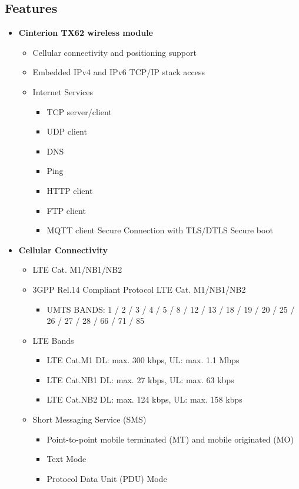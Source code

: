 	\subsection{Features} \cite{ArduinoPortenta:2024}
	\begin{itemize}[leftmargin=*]
		\item \textbf{Cinterion TX62 wireless module}
		\begin{itemize}[leftmargin=*]
			\item Cellular connectivity and positioning support
			\item Embedded IPv4 and IPv6 TCP/IP stack access
			\item Internet Services
			\begin{itemize}[label=--]
				\item TCP server/client
				\item UDP client
				\item DNS
				\item Ping
				\item HTTP client
				\item FTP client
				\item MQTT client Secure Connection with TLS/DTLS Secure boot
			\end{itemize}
		\end{itemize}
		
		\item \textbf{Cellular Connectivity}
		\begin{itemize}[leftmargin=*]
			\item LTE Cat. M1/NB1/NB2
			\item 3GPP Rel.14 Compliant Protocol LTE Cat. M1/NB1/NB2 
			\begin{itemize}[label=--]
				\item UMTS BANDS: 1 / 2 / 3 / 4 / 5 / 8 / 12 / 13 / 18 / 19 / 20 / 25 / 26 / 27 / 28 / 66 / 71 / 85
			\end{itemize}
			\item {LTE Bands}
			\begin{itemize}[label=--]
				\item LTE Cat.M1 DL: max. 300 kbps, UL: max. 1.1 Mbps
				\item LTE Cat.NB1 DL: max. 27 kbps, UL: max. 63 kbps
				\item LTE Cat.NB2 DL: max. 124 kbps, UL: max. 158 kbps
			\end{itemize}
			
			\item {Short Messaging Service (SMS)}
			\begin{itemize}[label=--]
				\item Point-to-point mobile terminated (MT) and mobile originated (MO)
				\item Text Mode
				\item Protocol Data Unit (PDU) Mode
			\end{itemize}


\end{itemize}
\end{itemize}
